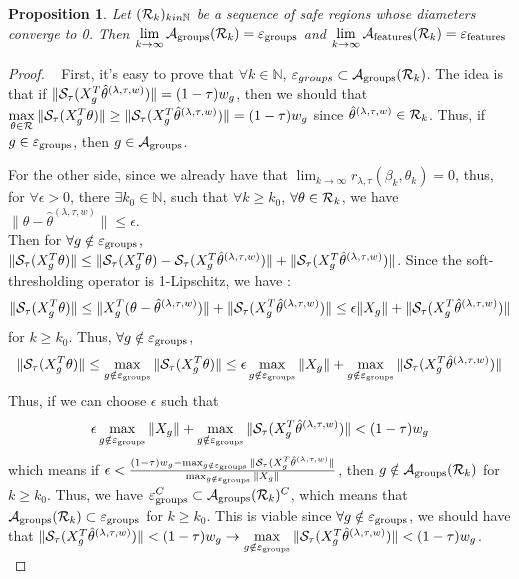 \documentclass{article}
\def\cS{{\cal S}}
\def\ca{{\cal A}}
\def\cR{{\cal R}}
\def\cep{{\cal \varepsilon}}
\newtheorem{proposition}{Proposition}[section]
\begin{document}
\vspace{2em}
\begin{proposition}
Let $(\cR_k)_{k in \mathbb{N}}$ be a sequence of safe regions whose diameters converge to 0. Then $\lim\limits_{k \to \infty} \ca_{\text{groups}}(\cR_k) = \cep_{\text{groups}}$ and $\lim\limits_{k \to \infty}\ca_{\text{features}}(\cR_k) = \cep_{\text{features}}$
\end{proposition}
\begin{proof} ~\newline
First, it's easy to prove that $\forall k \in \mathbb{N}$, $\cep_{groups} \subset \ca_{\text{groups}}(\cR_k)$. The idea is that if $\|\cS_{\tau}(X_g^T \hat{\theta}^{(\lambda,\tau,w)})\| = (1-\tau)w_g$, then we should that $\max\limits_{\theta \in \cR}\|\cS_{\tau}(X_g^T \theta)\| \geq \|\cS_{\tau}(X_g^T \hat{\theta}^{(\lambda,\tau,w)})\| = (1-\tau)w_g$ since $\hat{\theta}^{(\lambda,\tau,w)} \in \cR_k$.  Thus, if $g \in \cep_{\text{groups}}$, then $g \in \ca_{\text{groups}}$.

For the other side, since we already have that $\lim_{k \to \infty} r_{\lambda,\tau}(\beta_k,\theta_k) = 0$, thus, for $\forall \epsilon >0$, there $\exists k_0 \in \mathbb{N}$, such that $\forall k \geq k_0$, $\forall \theta \in \cR_k$, we have $\|\theta - \hat{\theta}^{(\lambda,\tau,w)}\| \leq \epsilon$.  \\ 
Then for $\forall g \notin \cep_{\text{groups}}$,  $\|\cS_{\tau}(X_g^T \theta)\| \leq \| \cS_{\tau}(X_g^T \theta) - \cS_{\tau}(X_g^T \hat{\theta}^{(\lambda,\tau,w)})\| + \|\cS_{\tau}(X_g^T \hat{\theta}^{(\lambda,\tau,w)})\|$.  Since the soft-thresholding operator is 1-Lipschitz, we have :
$$
\|\cS_{\tau}(X_g^T \theta)\| \leq \| X_g^T( \theta-  \hat{\theta}^{(\lambda,\tau,w)})\| + \|\cS_{\tau}(X_g^T \hat{\theta}^{(\lambda,\tau,w)})\| \leq \epsilon\|X_g\| + \|\cS_{\tau}(X_g^T \hat{\theta}^{(\lambda,\tau,w)})\| 
$$
for  $k \geq k_0$.  Thus, $\forall g \notin \cep_{\text{groups}}$, 
$$
\|\cS_{\tau}(X_g^T \theta)\| \leq \max\limits_{g \notin \cep_{\text{groups}}} \|\cS_{\tau}(X_g^T \theta)\|  \leq \epsilon \max\limits_{g \notin \cep_{\text{groups}}} \|X_g\| + \max\limits_{g \notin \cep_{\text{groups}}}\|\cS_{\tau}(X_g^T \hat{\theta}^{(\lambda,\tau,w)})\|
$$
Thus, if we can choose $\epsilon$ such that 
$$
\epsilon \max\limits_{g \notin \cep_{\text{groups}}} \|X_g\| + \max\limits_{g \notin \cep_{\text{groups}}}\|\cS_{\tau}(X_g^T \hat{\theta}^{(\lambda,\tau,w)})\| < (1-\tau)w_g
$$
which means if $\epsilon < \frac{(1-\tau)w_g - \max_{g \notin \cep_{\text{groups}}}\|\cS_{\tau}(X_g^T \hat{\theta}^{(\lambda,\tau,w)}\|}{\max_{g \notin \cep_{\text{groups}}} \|X_g\|}$, then $g \notin \ca_{\text{groups}}(\cR_k)$ for $k \geq k_0$.  Thus, we have $\cep_{\text{groups}}^C \subset \ca_{\text{groups}}(\cR_k)^C$, which means that $\ca_{\text{groups}}(\cR_k) \subset \cep_{\text{groups}}$ for $k \geq k_0$. This is viable since $\forall g \notin \cep_{\text{groups}}$, we should have that $\|\cS_{\tau}(X_g^T \hat{\theta}^{(\lambda,\tau,w)})\| < (1-\tau)w_g \rightarrow \max\limits_{g \notin \cep_{\text{groups}}}\|\cS_{\tau}(X_g^T \hat{\theta}^{(\lambda,\tau,w)})\| < (1-\tau) w_g $. \\


\end{proof}
\end{document}
